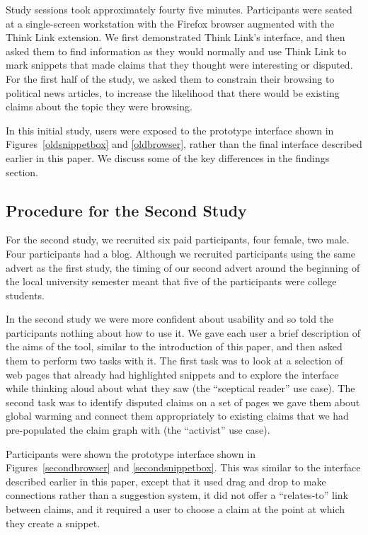 \documentclass{chi2009}
\newcommand{\todo}[1]{}
\begin{document}
\todo{This was a bad recruiting strategy. We should have recruited people that fitted one of our two personas and then set them tasks that fitted our vision for that persona.}

Study sessions took approximately fourty five minutes. Participants were seated at a single-screen workstation with the Firefox browser augmented with the Think Link extension. We first demonstrated Think Link's interface, and then asked them to find information as they would normally and use Think Link to mark snippets that made claims that they thought were interesting or disputed. For the first half of the study, we asked them to constrain their browsing to political news articles, to increase the likelihood that there would be existing claims about the topic they were browsing.

In this initial study, users were exposed to the prototype interface shown in Figures~\ref{oldsnippetbox} and \ref{oldbrowser}, rather than the final interface described earlier in this paper. We discuss some of the key differences in the findings section.

\subsection{Procedure for the Second Study}

For the second study, we recruited six paid participants, four female, two male. Four participants had a blog. Although we recruited participants using the same advert as the first study, the timing of our second advert around the beginning of the local university semester meant that five of the participants were college students. 

In the second study we were more confident about usability and so told the participants nothing about how to use it. We gave each user a brief description of the aims of the tool, similar to the introduction of this paper, and then asked them to perform two tasks with it. The first task was to look at a selection of web pages that already had highlighted snippets and to explore the interface while thinking aloud about what they saw (the ``sceptical reader'' use case). The second task was to identify disputed claims on a set of pages we gave them about global warming and connect them appropriately to existing claims that we had pre-populated the claim graph with (the ``activist'' use case). 

Participants were shown the prototype interface shown in Figures~\ref{secondbrowser} and \ref{secondsnippetbox}. This was similar to the interface described earlier in this paper, except that it used drag and drop to make connections rather than a suggestion system, it did not offer a ``relates-to'' link between claims, and it required a user to choose a claim at the point at which they create a snippet. 
\end{document}
